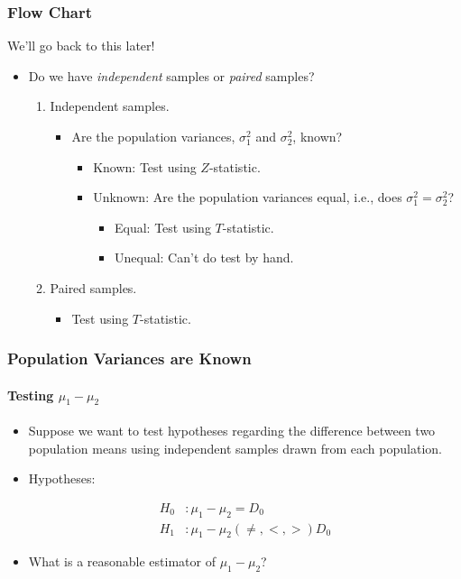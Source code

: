 \documentclass[12pt]{beamer}
\begin{document}
\begin{frame}
	\frametitle{Flow Chart}
	We'll go back to this later!
	
	\begin{itemize}[label={\color{blue}$\blacktriangleright$}]
		\item Do we have \textit{independent} samples or \textit{paired} samples?
		\begin{enumerate}[label=\textcolor{blue}{\arabic*.}]
			\item Independent samples.
			\begin{itemize}[label={\color{blue}$\blacktriangleright$}]
				\item Are the population variances, $\sigma_1^2$ and $\sigma_2^2$, known?
				\begin{itemize}[label={\color{blue}$\blacktriangleright$}]
					\item Known: Test using $Z$-statistic.
					\item Unknown: Are the population variances equal, i.e., does $\sigma_1^2 = \sigma_2^2$?
					\begin{itemize}[label={\color{blue}$\blacktriangleright$}]
						\item Equal: Test using $T$-statistic.
						\item Unequal: Can't do test by hand.
					\end{itemize}
				\end{itemize}
			\end{itemize}
			\item Paired samples.
			\begin{itemize}[label={\color{blue}$\blacktriangleright$}]
				\item Test using $T$-statistic.
			\end{itemize}
		\end{enumerate}
	\end{itemize}
	
\end{frame}
\begin{frame}
	\frametitle{Population Variances are Known}
	\framesubtitle{Testing $\mu_1 - \mu_2$}
	
	\begin{itemize}[label={\color{blue}$\blacktriangleright$}]
		\item Suppose we want to test hypotheses regarding the difference between two population means using independent samples drawn from each population.
		
		\item Hypotheses:
		
		\begin{align*}
			H_0 &: \mu_1 - \mu_2 = D_0 \\
			H_1 &: \mu_1 - \mu_2 (\neq, <, >) D_0
		\end{align*}
		
		\item What is a reasonable estimator of $\mu_1 - \mu_2$?
	\end{itemize}
	
\end{frame}
\end{document}

